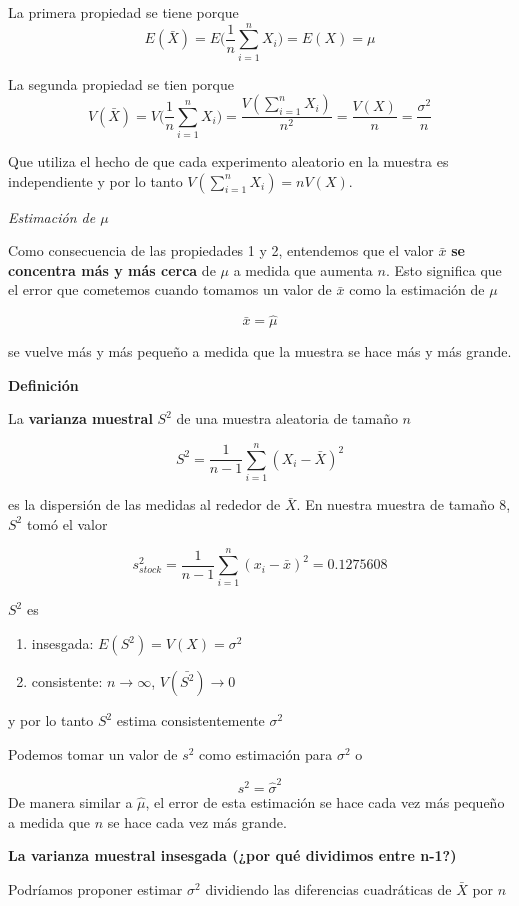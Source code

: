 \documentclass[
]{book}
\providecommand{\tightlist}{%
  \setlength{\itemsep}{0pt}\setlength{\parskip}{0pt}}
\begin{document}
La primera propiedad se tiene porque
\[E(\bar{X})=E\big(\frac{1}{n}\sum_{i=1}^n X_i\big)=E(X)=\mu\]

La segunda propiedad se tien porque
\[V(\bar{X})=V\big(\frac{1}{n}\sum_{i=1}^n X_i\big)=\frac{V(\sum_{i=1}^ nX_i)}{n^2}=\frac{V(X)}{n}=\frac{\sigma^2}{n}\]

Que utiliza el hecho de que cada experimento aleatorio en la muestra es independiente y por lo tanto \(V(\sum_{i=1}^n X_i)=nV(X)\).

\emph{Estimación de \(\mu\)}

Como consecuencia de las propiedades 1 y 2, entendemos que el valor \(\bar{x}\) \textbf{se concentra más y más cerca} de \(\mu\) a medida que aumenta \(n\). Esto significa que el error que cometemos cuando tomamos un valor de \(\bar{x}\) como la estimación de \(\mu\)

\[\bar{x}=\hat{\mu}\]

se vuelve más y más pequeño a medida que la muestra se hace más y más grande.

\textbf{Definición}

La \textbf{varianza muestral} \(S^2\) de una muestra aleatoria de tamaño \(n\)

\[S^2= \frac{1}{n-1}\sum_{i=1}^n (X_i-\bar{X})^2\]

es la dispersión de las medidas al rededor de \(\bar{X}\). En nuestra muestra de tamaño \(8\), \(S^2\) tomó el valor

\[s_{stock}^2=\frac{1}{n-1}\sum_{i=1}^n (x_i-\bar{x})^2=0.1275608\]

\(S^2\) es

\begin{enumerate}
\def\labelenumi{\arabic{enumi})}
\tightlist
\item
  insesgada: \(E(S^2)=V(X)=\sigma^2\)
\item
  consistente: \(n \rightarrow \infty\), \(V(\bar{S^2}) \rightarrow 0\)
\end{enumerate}

y por lo tanto \(S^2\) estima consistentemente \(\sigma^2\)

Podemos tomar un valor de \(s^2\) como estimación para \(\sigma^2\) o

\[s^2=\hat{\sigma}^2\]
De manera similar a \(\hat{\mu}\), el error de esta estimación se hace cada vez más pequeño a medida que \(n\) se hace cada vez más grande.

\textbf{La varianza muestral insesgada (¿por qué dividimos entre n-1?)}

Podríamos proponer estimar \(\sigma^2\) dividiendo las diferencias cuadráticas de \(\bar{X}\) por \(n\)
\end{document}
